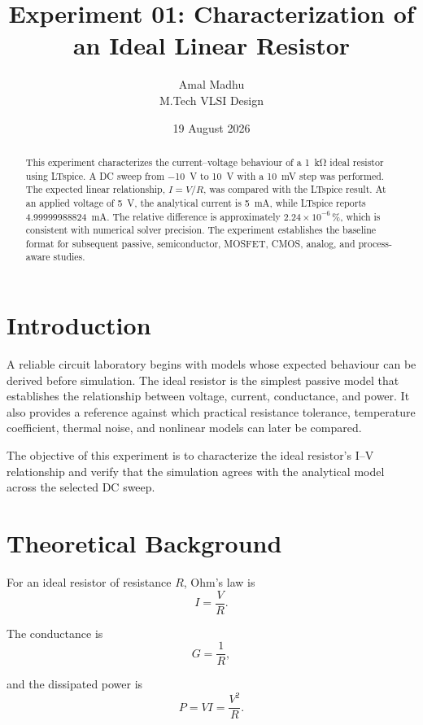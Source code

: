 \documentclass[11pt,a4paper]{article}
\title{Experiment 01: Characterization of an Ideal Linear Resistor}
\author{Amal Madhu\\M.Tech VLSI Design}
\date{19 August 2026}
\begin{document}
\maketitle

\begin{abstract}
This experiment characterizes the current--voltage behaviour of a \SI{1}{\kilo\ohm} ideal resistor using LTspice. A DC sweep from \SI{-10}{\volt} to \SI{10}{\volt} with a \SI{10}{\milli\volt} step was performed. The expected linear relationship, $I=V/R$, was compared with the LTspice result. At an applied voltage of \SI{5}{\volt}, the analytical current is \SI{5}{\milli\ampere}, while LTspice reports \SI{4.99999988824}{\milli\ampere}. The relative difference is approximately $2.24\times10^{-6}\,\%$, which is consistent with numerical solver precision. The experiment establishes the baseline format for subsequent passive, semiconductor, MOSFET, CMOS, analog, and process-aware studies.
\end{abstract}

\section{Introduction}

A reliable circuit laboratory begins with models whose expected behaviour can be derived before simulation. The ideal resistor is the simplest passive model that establishes the relationship between voltage, current, conductance, and power. It also provides a reference against which practical resistance tolerance, temperature coefficient, thermal noise, and nonlinear models can later be compared.

The objective of this experiment is to characterize the ideal resistor's I--V relationship and verify that the simulation agrees with the analytical model across the selected DC sweep.

\section{Theoretical Background}

For an ideal resistor of resistance $R$, Ohm's law is
\begin{equation}
I = \frac{V}{R}.
\end{equation}

The conductance is
\begin{equation}
G = \frac{1}{R},
\end{equation}

and the dissipated power is
\begin{equation}
P = VI = \frac{V^2}{R}.
\end{equation}
\end{document}
